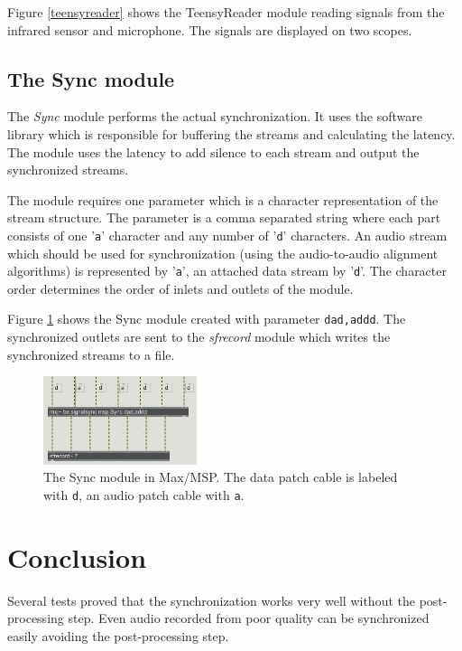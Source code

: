 \documentclass[twocolumn]{phdsymp} %
\begin{document}
Figure \ref{teensyreader} shows the TeensyReader module reading signals from the infrared sensor and microphone. The signals are displayed on two scopes.


\subsection{The Sync module}

The \emph{Sync} module performs the actual synchronization. It uses the software library which is responsible for buffering the streams and calculating the latency. The module uses the latency to add silence to each stream and output the synchronized streams.

The module requires one parameter which is a character representation of the stream structure. The parameter is a comma separated string where each part consists of one '\texttt{a}' character and any number of '\texttt{d}' characters. An audio stream which should be used for synchronization (using the audio-to-audio alignment algorithms) is represented by '\texttt{a}', an attached data stream by '\texttt{d}'. The character order determines the order of inlets and outlets of the module.

Figure \ref{sync} shows the Sync module created with parameter \texttt{dad,addd}. The synchronized outlets are sent to the \emph{sfrecord} module which writes the synchronized streams to a file.

\begin{figure}[ht]
	\begin{center}
		\includegraphics[width=0.4\textwidth]{../boek/figuren/syncwrite.png}
		\caption{\label{sync}The Sync module in Max/MSP. The data patch cable is labeled with \texttt{d}, an audio patch cable with \texttt{a}.}
	\end{center}
\end{figure}


\section{Conclusion}
Several tests proved that the synchronization works very well without the post-processing step. Even audio recorded from poor quality can be synchronized easily avoiding the post-processing step. 



\end{document}
